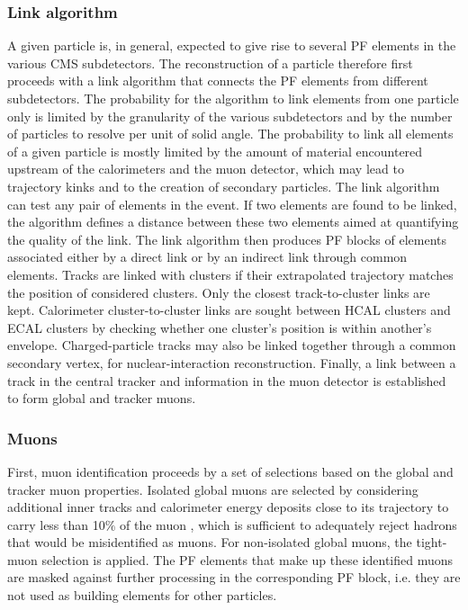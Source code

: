 \subsubsection{Link algorithm}
A given particle is, in general, expected to give rise to several PF elements in the various CMS subdetectors. The reconstruction of a particle therefore first proceeds with a link algorithm that connects the PF elements from different subdetectors. The probability for the algorithm to link elements from one particle only is limited by the granularity of the various subdetectors and by the number of particles to resolve per unit of solid angle. The probability to link all elements of a given particle is mostly limited by the amount of material encountered upstream of the calorimeters and the muon detector, which may lead to trajectory kinks and to the creation of secondary particles. The link algorithm can test any pair of elements in the event. If two elements are found to be linked, the algorithm defines a distance between these two elements aimed at quantifying the quality of the link. The link algorithm then produces PF blocks of elements associated either by a direct link or by an indirect link through common elements. Tracks are linked with clusters if their extrapolated trajectory matches the position of considered clusters. Only the closest track-to-cluster links are kept. Calorimeter cluster-to-cluster links are sought between HCAL clusters and ECAL clusters by checking whether one cluster's position is within another's envelope. Charged-particle tracks may also be linked together through a common secondary vertex, for nuclear-interaction reconstruction. Finally, a link between a track in the central tracker and information in the muon detector is established to form global and tracker muons.

\subsubsection{Muons} First, muon identification proceeds by a set of selections based on the global and tracker muon properties. Isolated global muons are selected by considering additional inner tracks and calorimeter energy deposits close to its trajectory to carry less than 10$\%$ of the muon \pt, which is sufficient to adequately reject hadrons that would be misidentified as muons. For non-isolated global muons, the tight-muon selection \cite{collaboration_2012} is applied. The PF elements that make up these identified muons are masked against further processing in the corresponding PF block, i.e. they are not used as building elements for other particles.


